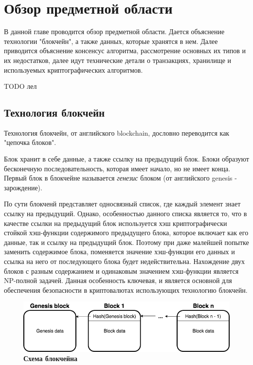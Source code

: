 
\graphicspath{ {images/} }

\startrelatedwork

\chapter{Обзор предметной области}
В данной главе проводится обзор предметной области.
Дается объяснение технологии "блокчейн", а также данных, которые хранятся в нем.
Далее приводится объяснение консенсус алгоритма, рассмотрение основных их типов и их недостатков, далее идут технические детали о транзакциях, хранилище и используемых криптографических алгоритмов.

TODO лел

\section{Технология блокчейн}

Технология блокчейн, от английского blockchain, дословно переводится  как "цепочка блоков".

Блок хранит в себе данные, а также ссылку на предыдущий блок. 
Блоки образуют бесконечную последовательность, которая имеет начало, но не имеет конца.
Первый блок в блокчейне называется \textit{генезис} блоком (от английского genesis - зарождение).

По сути блокченй представляет односвязный список, где каждый элемент знает ссылку на предыдущий. 
Однако, особенностью данного списка является то,  что в качестве ссылки на предыдущий блок 
используется хэш криптографически стойкой хэш-функции содержимого предыдущего блока, 
которое включает как его данные, так и ссылку на предыдущий блок. 
Поэтому при даже малейшей попытке заменить содержимое блока, 
поменяется значение хэш-функции его данных и ссылка на него от последующего блока будет недействительна.
Нахождение двух блоков с разным содержанием и одинаковым значением хэш-функции является NP-полной задачей.
Данная особенность ключевая, и  является основной для обеспечения безопасности в криптовалютах использующих технологию блокчейн.

\begin{figure}[h]
\includegraphics[scale=0.6]{Blockchain_Scheme}
\caption{\textbf{Схема блокчейна}}
\label{fig:blockchain}
\end{figure}


